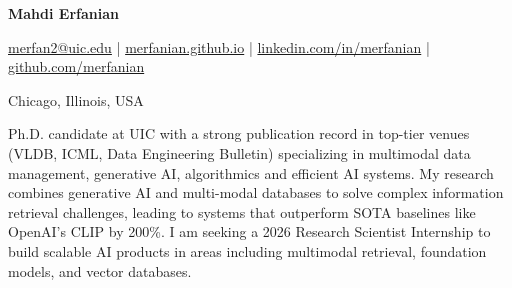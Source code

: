 \documentclass[a4paper,11pt]{article}
\newcommand{\socialicon}[1]{\raisebox{-0.05em}{\resizebox{!}{1em}{#1}}}
\newcommand{\ieeeicon}[1]{\raisebox{-0.3em}{\resizebox{!}{1.3em}{#1}}}
\newcommand{\headerfontiii}{\fontfamily{ppl}\selectfont} %
\begin{document}
\headerfontiii

\begin{center}
    {\Huge\textbf{Mahdi Erfanian}}
\end{center}
\vspace{-6mm}

\begin{center}
    \small{
    \socialicon{\faEnvelope}
    \href{mailto:merfan2@uic.edu}{merfan2@uic.edu}
    | 
    \socialicon{\faHome}
    \href{https://merfanian.github.io/}{merfanian.github.io} |
    \socialicon{\faLinkedin} \href{https://www.linkedin.com/in/merfanian/}{linkedin.com/in/merfanian} | 
    \socialicon{\faGithub} \href{https://github.com/merfanian}{github.com/merfanian} 
    
    }
\end{center}

    
\vspace{-6mm}
\begin{center}
    \small{Chicago, Illinois, USA}
\end{center}
\vspace{-6mm}

\begin{justify}
\small{Ph.D. candidate at UIC with a strong publication record in top-tier venues (VLDB, ICML, Data Engineering Bulletin) specializing in multimodal data management, generative AI, algorithmics and efficient AI systems. My research combines generative AI and multi-modal databases to solve complex information retrieval challenges, leading to systems that outperform SOTA baselines like OpenAI's CLIP by 200\%.  I am seeking a 2026 Research Scientist Internship to build scalable AI products in areas including multimodal retrieval, foundation models, and vector databases.}    
\end{justify}

\vspace{-6mm}
\end{document}
